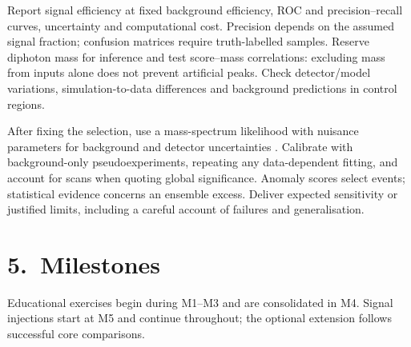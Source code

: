 \documentclass[11pt,a4paper]{article}
\begin{document}
Report signal efficiency at fixed background efficiency, ROC and
precision--recall curves, uncertainty and computational
cost. Precision depends on the assumed signal fraction; confusion
matrices require truth-labelled samples. Reserve diphoton mass for
inference and test score--mass correlations: excluding mass from
inputs alone does not prevent artificial peaks. Check detector/model
variations, simulation-to-data differences and background predictions
in control regions.

After fixing the selection, use a mass-spectrum likelihood with
nuisance parameters for background and detector uncertainties
\cite{stats}. Calibrate with background-only pseudoexperiments,
repeating any data-dependent fitting, and account for scans when
quoting global significance. Anomaly scores select events; statistical
evidence concerns an ensemble excess. Deliver expected sensitivity or
justified limits, including a careful account of failures and
generalisation.

\newpage
\section{5.\ Milestones}

Educational exercises begin during M1--M3 and are consolidated in
M4. Signal injections start at M5 and continue throughout; the
optional extension follows successful core comparisons.
\end{document}
